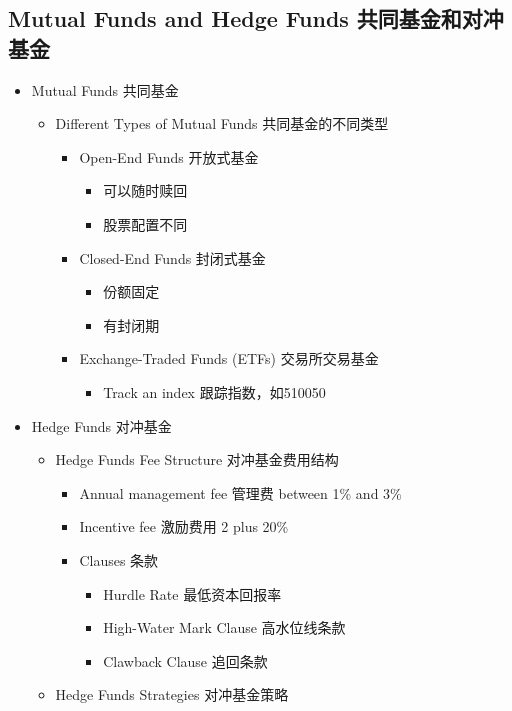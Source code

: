 \documentclass[a4paper,6pt,twoside,openany]{article}
\begin{document}
\subsection{Mutual Funds and Hedge Funds 共同基金和对冲基金}
\begin{itemize}
\item Mutual Funds 共同基金
  \begin{itemize}
  \item Different Types of Mutual Funds 共同基金的不同类型
    \begin{itemize}
    \item Open-End Funds 开放式基金
      \begin{itemize}
      \item 可以随时赎回
      \item 股票配置不同
      \end{itemize}
    \item Closed-End Funds 封闭式基金
      \begin{itemize}
      \item 份额固定
      \item 有封闭期
      \end{itemize}
    \item Exchange-Traded Funds (ETFs) 交易所交易基金
      \begin{itemize}
      \item Track an index 跟踪指数，如510050
      \end{itemize}
    \end{itemize}
  \end{itemize}
\item Hedge Funds 对冲基金
  \begin{itemize}
  \item Hedge Funds Fee Structure 对冲基金费用结构
    \begin{itemize}
    \item Annual management fee 管理费 between 1\% and 3\%
    \item Incentive fee 激励费用 2 plus 20\%
    \item Clauses 条款
      \begin{itemize}
      \item Hurdle Rate 最低资本回报率
      \item High-Water Mark Clause 高水位线条款
      \item Clawback Clause 追回条款
      \end{itemize}
    \end{itemize}
  \item Hedge Funds Strategies 对冲基金策略

\end{itemize}
\end{itemize}
\end{document}
